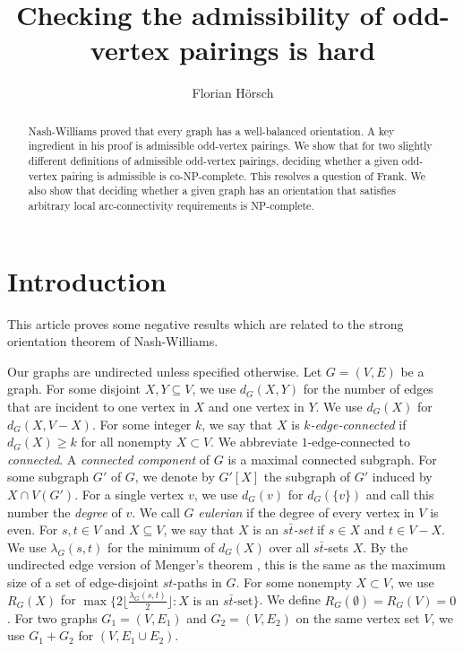 \documentclass[a4paper,12pt,makeidx]{article}
\title{Checking the admissibility of odd-vertex pairings is hard}
\author{Florian H\"{o}rsch}
\begin{document}
\maketitle

\begin{abstract}
Nash-Williams proved that every graph has a well-balanced orientation. A key ingredient in his proof is admissible odd-vertex pairings. We show that for two slightly different definitions of admissible odd-vertex pairings, deciding whether a given odd-vertex pairing is admissible is co-NP-complete. This resolves a question of Frank. We also show that deciding whether a given graph has an orientation that satisfies arbitrary local arc-connectivity requirements is NP-complete.
\end{abstract}

\section{Introduction}
This article proves some negative results which are related to the strong orientation theorem of Nash-Williams.
\medskip

Our graphs are undirected unless specified otherwise. Let $G=(V,E)$ be a graph. For some disjoint $X,Y \subseteq V$, we use $d_G(X,Y)$ for the number of edges that are incident to one vertex in $X$ and one vertex in $Y$. We use $d_G(X)$ for $d_G(X,V-X)$. For some integer $k$,  we say that $X$ is {\it $k$-edge-connected} if $d_G(X)\geq k$ for all nonempty $X \subset V$. We abbreviate $1$-edge-connected to {\it connected}. A {\it connected component} of $G$ is a maximal connected subgraph. For some subgraph $G'$ of $G$, we denote by $G'[X]$ the subgraph of $G'$ induced by $X \cap V(G')$. For a single vertex $v$, we use $d_G(v)$ for $d_G(\{v\})$ and call this number the {\it degree} of $v$. We call $G$ {\it eulerian} if the degree of every vertex in $V$ is even. For $s,t \in V$ and $X \subseteq V$, we say that $X$ is an {\it $s\bar{t}$-set} if $s \in X$ and $t \in V-X$. We use $\lambda_G(s,t)$ for the minimum of $d_G(X)$ over all $s\bar{t}$-sets $X$. By the undirected edge version of Menger's theorem \cite{m}, this is the same as the maximum size of a set of edge-disjoint $st$-paths in $G$. For some nonempty $X \subset V$, we use $R_G(X)$ for $\max\{2\lfloor\frac{\lambda_G(s,t)}{2}
\rfloor:X\text{ is an }s\bar{t}\text{-set}\}$. We define $R_G(\emptyset)=R_G(V)=0$. For two graphs $G_1=(V,E_1)$ and $G_2=(V,E_2)$ on the same vertex set $V$, we use $G_1+G_2$ for $(V,E_1\cup E_2)$.
\end{document}
